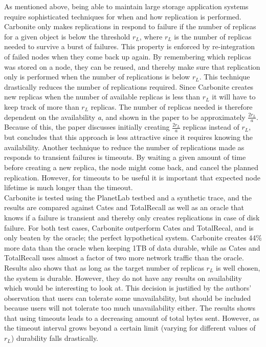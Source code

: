 \documentclass{article}
\begin{document}
\noindent As mentioned above, being able to maintain large storage application systems require sophisticated techniques for when and how replication is performed. Carbonite only makes replications in respond to failure if the number of replicas for a given object is below the threshold $r_L$, where $r_L$ is the number of replicas needed to survive a burst of failures. This property is enforced by re-integration of failed nodes when they come back up again. By remembering which replicas was stored on a node, they can be reused, and thereby make sure that replication only is performed when the number of replications is below $r_L$. This technique drastically reduces the number of replications required. Since Carbonite creates new replicas when the number of available replicas is less than $r_L$ it will have to keep track of more than $r_L$ replicas. The number of replicas needed is therefore dependent on the availability \textit{a}, and shown in the paper to be approximately $\frac{2r_L}{a}$. Because of this, the paper discusses initially creating $\frac{2r_L}{a}$ replicas instead of $r_L$, but concludes that this approach is less attractive since it requires knowing the availability.
Another technique to reduce the number of replications made as responds to transient failures is timeouts. By waiting a given amount of time before creating a new replica, the node might come back, and cancel the planned replication. However, for timeouts to be useful it is important that  expected node lifetime is much longer than the timeout.\\

\noindent Carbonite is tested using the PlanetLab testbed and a synthetic trace, and the results are compared against Cates and TotalRecall as well as an oracle that knows if a failure is transient and thereby only creates replications in case of disk failure. For both test cases, Carbonite outperform Cates and TotalRecal, and is only beaten by the oracle; the perfect hypothetical system. Carbonite creates 44\% more data than the oracle when keeping 1TB of data durable, while as Cates and TotalRecall uses almost a factor of two more network traffic than the oracle. Results also shows that as long as the target number of replicas $r_L$ is well chosen, the system is durable. However, they do not have any results on availability which would be interesting to look at. This decision is justified by the authors' observation that users can tolerate some unavailability, but should be included because users will not tolerate too much unavailability either. 
The results shows that using timeouts leads to a decreasing amount of total bytes sent. However, as the timeout interval grows beyond a certain limit (varying for different values of $r_L$) durability falls drastically.\\
\end{document}
